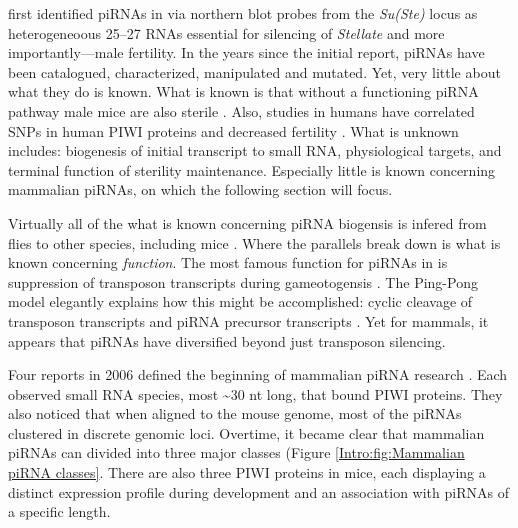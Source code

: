 {    \citet{Aravin2001} first identified piRNAs in \flies{} via northern blot probes from the \textit{Su(Ste)} locus as heterogeneoous 25--27 RNAs essential for silencing of \textit{Stellate} and more importantly---male fertility. In the years since the initial report, piRNAs have been catalogued, characterized, manipulated and mutated. Yet, very little about what they do is known. What is known is that without a functioning piRNA pathway male mice are also sterile \citep{Deng2002c,Kuramochi-Miyagawa2004}. Also, studies in humans have correlated SNPs in human PIWI proteins and decreased fertility \citep{Gu2010a}. What is unknown includes: biogenesis of initial transcript to small RNA, physiological targets, and terminal function of sterility maintenance. Especially little is known concerning mammalian piRNAs, on which the following section will focus.

    Virtually all of the what is known concerning piRNA biogensis is infered from flies to other species, including mice \citep{Siomi2011,Luteijn2013,Hirose2014}. Where the parallels break down is what is known concerning \textit{function}. The most famous function for piRNAs in \flies{} is suppression of transposon transcripts during gameotogensis \citep{Malone2009}. The Ping-Pong model elegantly explains how this might be accomplished: cyclic cleavage of transposon transcripts and piRNA precursor transcripts \citep{Brennecke2007,Gunawardane2007}. Yet for mammals, it appears that piRNAs have diversified beyond just transposon silencing.

    Four reports in 2006 defined the beginning of mammalian piRNA research \citep{Aravin2006,Grivna2006,Girard2006,Lau2006}. Each observed small RNA species, most \textasciitilde30 nt long, that bound PIWI proteins. They also noticed that when aligned to the mouse genome, most of the piRNAs clustered in discrete genomic loci. Overtime, it became clear that mammalian piRNAs can divided into three major classes (Figure \ref{Intro:fig:Mammalian piRNA classes}. There are also three PIWI proteins in mice, each displaying a distinct expression profile during development and an association with piRNAs of a specific length. 

}
